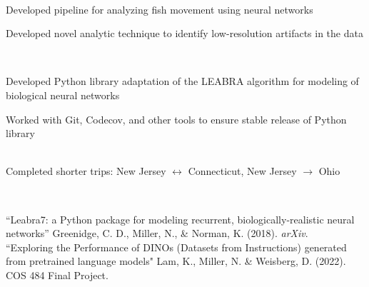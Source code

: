 \documentclass[a4paper]{MagicalCV}
\begin{document}
\begin{minipage}[t]{0.66\textwidth}
 \\
\vspace{\topsep} %
\begin{tightemize}
\item Developed pipeline for analyzing fish movement using neural networks
\item Developed novel analytic technique to identify low-resolution artifacts in the data
\end{tightemize}
\sectionsep

 \\
\vspace{\topsep} %
\begin{tightemize}
\item Developed Python library adaptation of the LEABRA algorithm for modeling of biological neural networks
\item Worked with Git, Codecov, and other tools to ensure stable release of Python library
\end{tightemize}


 \\
\vspace{\topsep} %
Completed shorter trips: New Jersey $\longleftrightarrow$ Connecticut, New Jersey $\rightarrow$ Ohio

 \\
\begin{hangparas}{2em}{1}
“Leabra7: a Python package for modeling recurrent, biologically-realistic neural networks” Greenidge, C. D., Miller, N., \& Norman, K. (2018). \textit{arXiv}. \\
“Exploring the Performance of DINOs (Datasets from Instructions) generated from pretrained language models" Lam, K., Miller, N. \& Weisberg, D. (2022). COS 484 Final Project.
\end{hangparas}
\end{minipage} 
\end{document}
